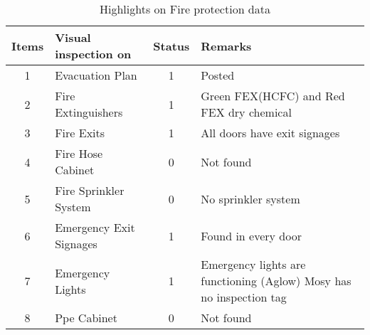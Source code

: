 \begin{table}[!h]
	\caption{Highlights on Fire protection data}
	\label{ch04_tbl_fdas_safety}
	{\scriptsize
\begin{tabular}{c|l|c|l}
	\hline
	Items & Visual inspection on & Status & Remarks \\ 
	\hline
	1 & Evacuation Plan & 1 & Posted  \\ 
	2 & Fire Extinguishers & 1 & Green FEX(HCFC) and Red FEX dry chemical \\ 
	3 & Fire Exits & 1 & All doors have exit signages \\ 
	4 & Fire Hose Cabinet & 0 & Not found \\ 
	5 & Fire Sprinkler System & 0 & No sprinkler system \\ 
	6 & Emergency Exit Signages & 1 & Found in every door \\ 
	7 & Emergency Lights & 1 & Emergency lights are functioning (Aglow) Mosy has no inspection tag \\ 
	8 & Ppe Cabinet & 0 & Not found \\ 
	\hline
\end{tabular}
	}
\end{table}